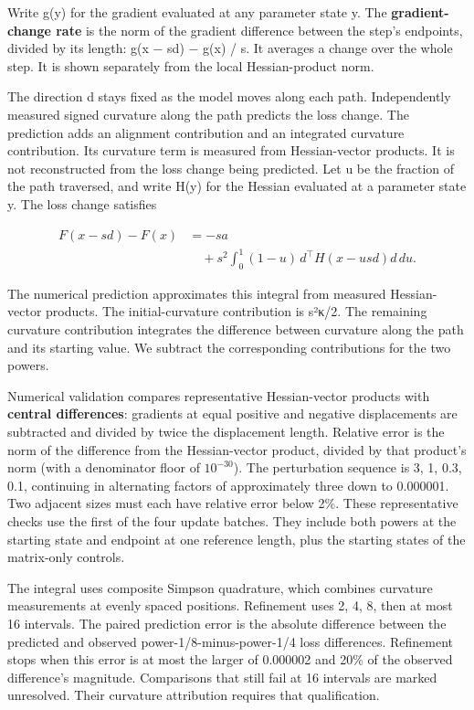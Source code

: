 \documentclass[
  14pt,
  letterpaper,
]{extarticle}
\begin{document}
Write g(y) for the gradient evaluated at any parameter state y. The
\textbf{gradient-change rate} is the norm of the gradient difference
between the step's endpoints, divided by its length:
\textbar\textbar g(x − sd) − g(x)\textbar\textbar{} / s. It averages a
change over the whole step. It is shown separately from the local
Hessian-product norm.

The direction d stays fixed as the model moves along each path.
Independently measured signed curvature along the path predicts the loss
change. The prediction adds an alignment contribution and an integrated
curvature contribution. Its curvature term is measured from
Hessian-vector products. It is not reconstructed from the loss change
being predicted. Let u be the fraction of the path traversed, and write
H(y) for the Hessian evaluated at a parameter state y. The loss change
satisfies

\[
\begin{aligned}F(x-sd)-F(x)&=-sa\\&\quad+s^2\int_0^1(1-u)\,d^\top H(x-usd)d\,du.\end{aligned}
\]

The numerical prediction approximates this integral from measured
Hessian-vector products. The initial-curvature contribution is s²κ/2.
The remaining curvature contribution integrates the difference between
curvature along the path and its starting value. We subtract the
corresponding contributions for the two powers.

Numerical validation compares representative Hessian-vector products
with \textbf{central differences}: gradients at equal positive and
negative displacements are subtracted and divided by twice the
displacement length. Relative error is the norm of the difference from
the Hessian-vector product, divided by that product's norm (with a
denominator floor of \(10^{-30}\)). The perturbation sequence is 3, 1,
0.3, 0.1, continuing in alternating factors of approximately three down
to 0.000001. Two adjacent sizes must each have relative error below 2\%.
These representative checks use the first of the four update batches.
They include both powers at the starting state and endpoint at one
reference length, plus the starting states of the matrix-only controls.

The integral uses composite Simpson quadrature, which combines curvature
measurements at evenly spaced positions. Refinement uses 2, 4, 8, then
at most 16 intervals. The paired prediction error is the absolute
difference between the predicted and observed power-1/8-minus-power-1/4
loss differences. Refinement stops when this error is at most the larger
of 0.000002 and 20\% of the observed difference's magnitude. Comparisons
that still fail at 16 intervals are marked unresolved. Their curvature
attribution requires that qualification.
\end{document}
